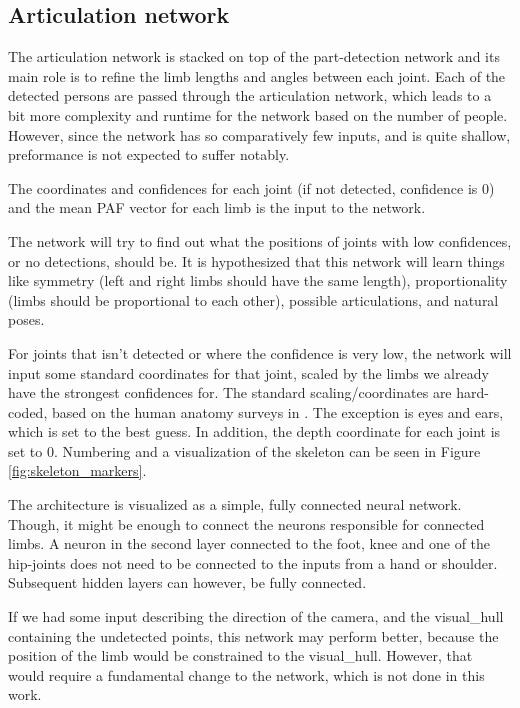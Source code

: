 \subsection{Articulation network}\label{subsec:articulation}
The articulation network is stacked on top of the part-detection network and its main role is to refine the limb lengths and angles between each joint. Each of the detected persons are passed through the articulation network, which leads to a bit more complexity and runtime for the network based on the number of people. However, since the network has so comparatively few inputs, and is quite shallow, preformance is not expected to suffer notably.

The coordinates and confidences for each joint (if not detected, confidence is 0) and the mean PAF vector for each limb is the input to the network.

The network will try to find out what the positions of joints with low confidences, or no detections, should be. It is hypothesized that this network will learn things like symmetry (left and right limbs should have the same length), proportionality (limbs should be proportional to each other), possible articulations, and natural poses.

For joints that isn't detected or where the confidence is very low, the network will input some standard coordinates for that joint, scaled by the limbs we already have the strongest confidences for. The standard scaling/coordinates are hard-coded, based on the human anatomy surveys in \cite{bodySegmentParams}. The exception is eyes and ears, which is set to the best guess. In addition, the depth coordinate for each joint is set to 0. Numbering and a visualization of the skeleton can be seen in Figure \ref{fig:skeleton_markers}.

The architecture is visualized as a simple, fully connected neural network. Though, it might be enough to connect the neurons responsible for connected limbs. A neuron in the second layer connected to the foot, knee and one of the hip-joints does not need to be connected to the inputs from a hand or shoulder. Subsequent hidden layers can however, be fully connected.

If we had some input describing the direction of the camera, and the \gls{visual_hull} containing the undetected points, this network may perform better, because the position of the limb would be constrained to the \gls{visual_hull}. However, that would require a fundamental change to the network, which is not done in this work.


